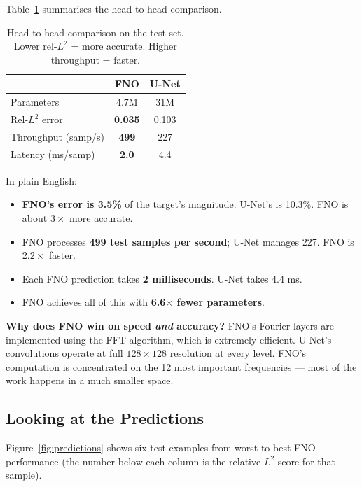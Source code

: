\documentclass[acmsmall,nonacm]{acmart}
\begin{document}
Table~\ref{tab:standard} summarises the head-to-head comparison.

\begin{table}[t]
  \centering
  \caption{Head-to-head comparison on the test set.
           Lower rel-$L^2$ = more accurate.
           Higher throughput = faster.}
  \label{tab:standard}
  \begin{tabular}{lcc}
    \toprule
    & \textbf{FNO} & \textbf{U-Net} \\
    \midrule
    Parameters          & 4.7M           & 31M \\
    Rel-$L^2$ error     & \textbf{0.035} & 0.103 \\
    Throughput (samp/s) & \textbf{499}   & 227 \\
    Latency (ms/samp)   & \textbf{2.0}   & 4.4 \\
    \bottomrule
  \end{tabular}
\end{table}

In plain English:
\begin{itemize}
  \item \textbf{FNO's error is 3.5\%} of the target's magnitude.
        U-Net's is 10.3\%. FNO is about $3\times$ more accurate.
  \item FNO processes \textbf{499 test samples per second};
        U-Net manages 227. FNO is $2.2\times$ faster.
  \item Each FNO prediction takes \textbf{2 milliseconds}.
        U-Net takes 4.4 ms.
  \item FNO achieves all of this with \textbf{6.6$\times$ fewer parameters}.
\end{itemize}

\begin{keypoint}
\textbf{Why does FNO win on speed \emph{and} accuracy?}
FNO's Fourier layers are implemented using the FFT algorithm, which is extremely
efficient.
U-Net's convolutions operate at full $128\times128$ resolution at every level.
FNO's computation is concentrated on the 12 most important frequencies ---
most of the work happens in a much smaller space.
\end{keypoint}

\subsection{Looking at the Predictions}

Figure~\ref{fig:predictions} shows six test examples from worst to best FNO
performance (the number below each column is the relative $L^2$ score for that
sample).
\end{document}
